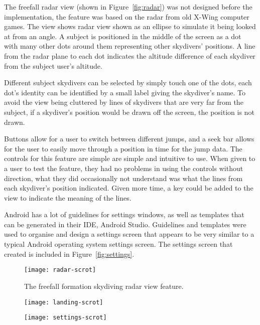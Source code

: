 The freefall radar view (shown in Figure~\vref{fig:radar}) was not designed before the implementation, the feature was based on the radar from old X-Wing computer games. The view shows radar view shown as an ellipse to simulate it being looked at from an angle. A subject is positioned in the middle of the screen as a dot with many other dots around them representing other skydivers' positions. A line from the radar plane to each dot indicates the altitude difference of each skydiver from the subject user's altitude.

Different subject skydivers can be selected by simply touch one of the dots, each dot's identity can be identified by a small label giving the skydiver's name. To avoid the view being cluttered by lines of skydivers that are very far from the subject, if a skydiver's position would be drawn off the screen, the position is not drawn.

Buttons allow for a user to switch between different jumps, and a seek bar allows for the user to easily move through a position in time for the jump data. The controls for this feature are simple are simple and intuitive to use. When given to a user to test the feature, they had no problems in using the controls without direction, what they did occasionally not understand was what the lines from each skydiver's position indicated. Given more time, a key could be added to the view to indicate the meaning of the lines.

Android has a lot of guidelines for settings windows, as well as templates that can be generated in their IDE, Android Studio. Guidelines and templates were used to organise and design a settings screen that appears to be very similar to a typical Android operating system settings screen.
The settings screen that created is included in Figure~\vref{fig:settings}.

\begin{figure}[ht]
  \centering
  \texttt{[image: radar-scrot]}
  \caption{The freefall formation skydiving radar view feature.}\label{fig:radar}
\end{figure}

\begin{figure}[H]
\centering
\begin{minipage}{.5\textwidth}
    \centering
    \texttt{[image: landing-scrot]}
    \label{fig:landing-scrot}
\end{minipage}%
\begin{minipage}{.5\textwidth}
    \centering
    \texttt{[image: settings-scrot]}
    \label{fig:settings}
\end{minipage}
\end{figure}
